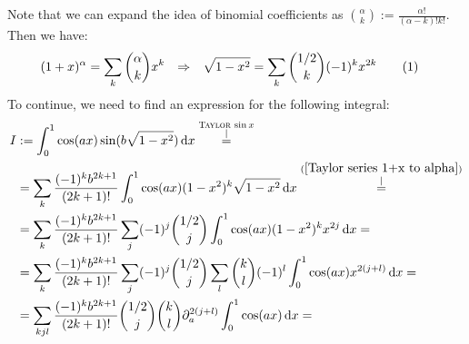 \documentclass[a4paper,12pt]{article}
\newcommand\numberthis{\addtocounter{equation}{1}\tag{\theequation}}
\newcommand{\kom}{}
\newcommand{\intx}{}
\begin{document}
Note that we can expand the idea of binomial coefficients as $\binom{\alpha}{k}:=\frac{\alpha!}{(\alpha-k)!k!}$. Then we have:
\begin{align*}
(1+x)^\alpha &=\sum_k\binom{\alpha}{k}x^k&\Rightarrow &&\sqrt{1-x^2}&=\sum_k\binom{1/2}{k}(-1)^kx^{2k}\numberthis\label{Taylor series 1+x to alpha}
\end{align*} 
To continue, we need to find an expression for the following integral:
\begin{align*}
I&:=\intx\int_{0}^{1}\cos(ax)\sin(b\sqrt{1-x^2})\,\mathrm{d}x\kom\overset{\substack{{\textsc{Taylor}\, }\sin x \\ |}}{=}\\
&=\sum_k\frac{(-1)^kb^{2k+1}}{(2k+1)!}\intx\int_{0}^{1}\cos(ax)(1-x^2)^k\sqrt{1-x^2}\,\mathrm{d}x\kom\overset{\substack{{(\ref{Taylor series 1+x to alpha})} \\ |}}{=}\\
&=\sum_k\frac{(-1)^kb^{2k+1}}{(2k+1)!}\sum_j(-1)^j\binom{1/2}{j}\intx\int_{0}^{1}\cos(ax)(1-x^2)^kx^{2j}\,\mathrm{d}x=\\
&=\sum_k\frac{(-1)^kb^{2k+1}}{(2k+1)!}\sum_j(-1)^j\binom{1/2}{j}\sum_l\binom{k}{l}(-1)^l\intx\int_{0}^{1}\cos(ax)x^{2(j+l)}\,\mathrm{d}x=\\
&=\sum_{kjl}\frac{(-1)^{k}b^{2k+1}}{(2k+1)!}\binom{1/2}{j}\binom{k}{l}\partial_a^{2(j+l)}\intx\int_{0}^{1}\cos(ax)\,\mathrm{d}x=
\end{align*}
\end{document}
